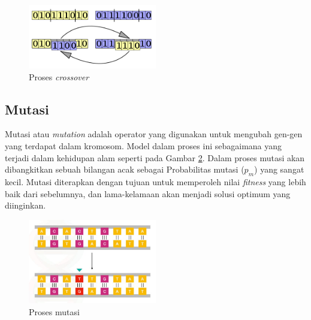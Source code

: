 \begin{figure}[H]
  \centering
  \includegraphics[width=0.5\textwidth]{Gambar/crossover.png}
  \caption{Proses \textit{crossover}}
  \label{fig:crossover}
\end{figure}

\subsection{Mutasi}
Mutasi atau \textit{mutation} adalah operator yang digunakan untuk mengubah gen-gen yang terdapat dalam kromosom. Model dalam proses ini sebagaimana yang terjadi dalam kehidupan alam \cite{rovie2014genetic} seperti pada Gambar \ref{fig:mutasi}. Dalam proses mutasi akan dibangkitkan sebuah bilangan acak sebagai Probabilitas mutasi ($p_m$) yang sangat kecil. Mutasi diterapkan dengan tujuan untuk memperoleh nilai \textit{fitness} yang lebih baik dari sebelumnya, dan lama-kelamaan akan menjadi solusi optimum yang diinginkan.

\begin{figure}[H]
  \centering
  \includegraphics[width=0.5\textwidth]{Gambar/mutasi.jpg}
  \caption{Proses mutasi}
  \label{fig:mutasi}
\end{figure}